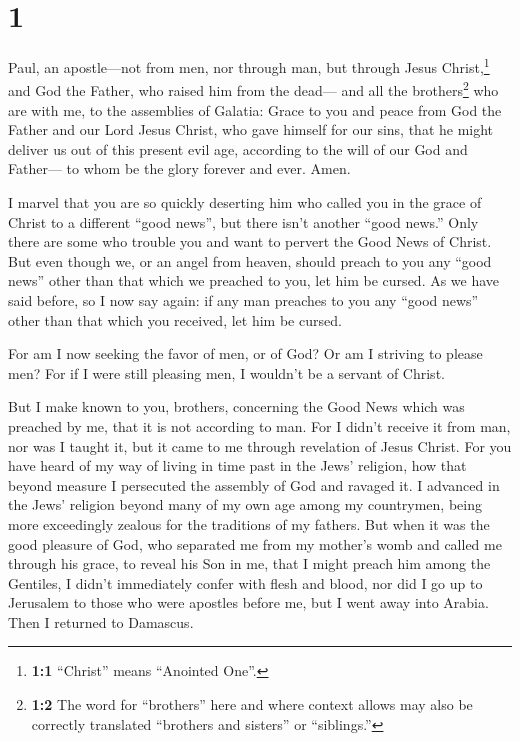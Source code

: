 \hypertarget{section}{%
\section{1}\label{section}}

 Paul, an apostle---not from men, nor through man, but
through Jesus Christ,\footnote{\textbf{1:1} ``Christ'' means ``Anointed
  One''.} and God the Father, who raised him from the dead---
 and all the brothers\footnote{\textbf{1:2} The word for
  ``brothers'' here and where context allows may also be correctly
  translated ``brothers and sisters'' or ``siblings.''} who are with me,
to the assemblies of Galatia:  Grace to you and peace from
God the Father and our Lord Jesus Christ,  who gave
himself for our sins, that he might deliver us out of this present evil
age, according to the will of our God and Father---  to
whom be the glory forever and ever. Amen.

 I marvel that you are so quickly deserting him who called
you in the grace of Christ to a different ``good news'', 
but there isn't another ``good news.'' Only there are some who trouble
you and want to pervert the Good News of Christ.  But even
though we, or an angel from heaven, should preach to you any ``good
news'' other than that which we preached to you, let him be cursed.
 As we have said before, so I now say again: if any man
preaches to you any ``good news'' other than that which you received,
let him be cursed.

 For am I now seeking the favor of men, or of God? Or am
I striving to please men? For if I were still pleasing men, I wouldn't
be a servant of Christ.

 But I make known to you, brothers, concerning the Good
News which was preached by me, that it is not according to man.
 For I didn't receive it from man, nor was I taught it,
but it came to me through revelation of Jesus Christ. 
For you have heard of my way of living in time past in the Jews'
religion, how that beyond measure I persecuted the assembly of God and
ravaged it.  I advanced in the Jews' religion beyond many
of my own age among my countrymen, being more exceedingly zealous for
the traditions of my fathers.  But when it was the good
pleasure of God, who separated me from my mother's womb and called me
through his grace,  to reveal his Son in me, that I might
preach him among the Gentiles, I didn't immediately confer with flesh
and blood,  nor did I go up to Jerusalem to those who
were apostles before me, but I went away into Arabia. Then I returned to
Damascus.

